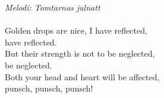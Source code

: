 {\footnotesize\textit{Melodi: Tomtarnas julnatt}}\\
\\
Golden drops are nice, I have reflected,\\
have reflected.\\
But their strength is not to be neglected,\\
be neglected.\\
Both your head and heart will be affected,\\
punsch, punsch, punsch!
